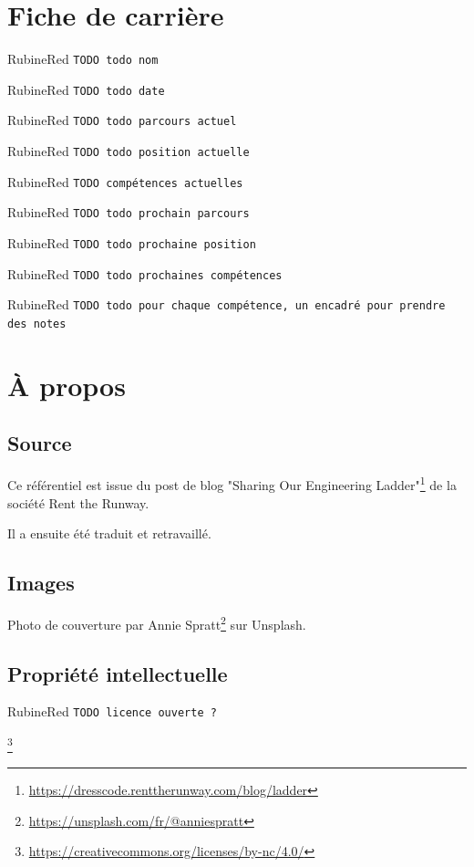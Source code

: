 \documentclass[a4paper, french, openany, 12pt]{book}
\newcommand{\todo}[1]{
  \begin{color}{RubineRed}
    \texttt{TODO {#1}}
  \end{color}
}
\begin{document}
\chapter*{Fiche de carrière}

\todo{todo nom}

\todo{todo date}

\todo{todo parcours actuel}

\todo{todo position actuelle}

\todo{compétences actuelles}

\todo{todo prochain parcours}

\todo{todo prochaine position}

\todo{todo prochaines compétences}

\todo{todo pour chaque compétence, un encadré pour prendre des notes}

\chapter*{À propos}

\begin{multicols}{2}
  \section*{Source}
  
  Ce référentiel est issue du post de blog 
  "Sharing Our Engineering Ladder"\footnote{\url{https://dresscode.renttherunway.com/blog/ladder}}
  de la société Rent the Runway.
  
  Il a ensuite été traduit et retravaillé.
  
  \section*{Images}
  
  Photo de couverture par Annie Spratt\footnote{\url{https://unsplash.com/fr/@anniespratt}} sur Unsplash.
  
  \section*{Propriété intellectuelle}
  
  \todo{licence ouverte ?}\footnote{\url{https://creativecommons.org/licenses/by-nc/4.0/}}
\end{multicols}

\tableofcontents
\end{document}
